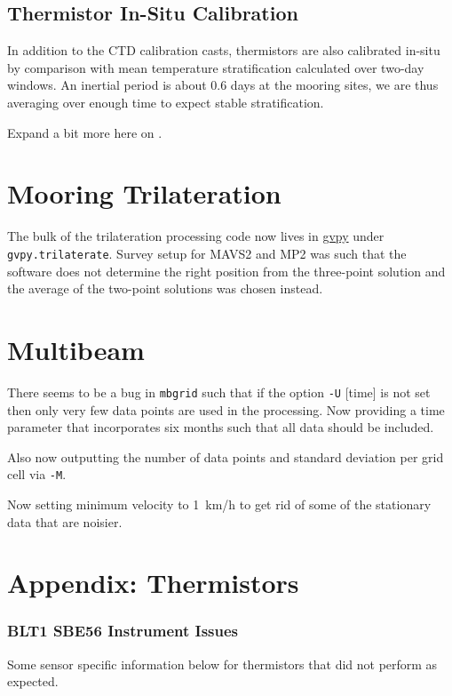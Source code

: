 \documentclass[10pt,letterpaper]{article}
\newcommand{\clink}[2]{{\color{modblue2} \href{#1}{#2}}}
\begin{document}
\clearpage


\subsection*{Thermistor In-Situ Calibration}
\label{sec:thermistor_in_situ_calibration}

In addition to the CTD calibration casts, thermistors are also calibrated in-situ by comparison with mean temperature stratification calculated over two-day windows. An inertial period is about 0.6 days at the mooring sites, we are thus averaging over enough time to expect stable stratification.

Expand a bit more here on \citet{cimatoribusetal16}.

\section*{Mooring Trilateration}
\label{sec:trilateration}
The bulk of the trilateration processing code now lives in \clink{https://github.com/gunnarvoet/gvpy}{gvpy} under \lstinline{gvpy.trilaterate}. Survey setup for MAVS2 and MP2 was such that the software does not determine the right position from the three-point solution and the average of the two-point solutions was chosen instead.


\section*{Multibeam}
\label{sec:multibeam}
There seems to be a bug in \lstinline{mbgrid} such that if the option \lstinline{-U} [time] is not set then only very few data points are used in the processing. Now providing a time parameter that incorporates six months such that all data should be included.

Also now outputting the number of data points and standard deviation per grid cell via \lstinline{-M}.

Now setting minimum velocity to \qty{1}{km/h} to get rid of some of the stationary data that are noisier.

\section*{Appendix: Thermistors}
\label{sec:appendix_thermistors}

\subsubsection*{BLT1 SBE56 Instrument Issues}
\label{ssub:blt1_sbe56_instrument_issues}
Some sensor specific information below for thermistors that did not perform as expected.
\end{document}
